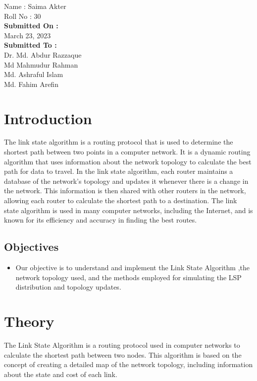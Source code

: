 \documentclass[11pt]{article}
\begin{document}
\begin{titlepage}
\begin{large}
			Name : Saima Akter\\[8pt]
			Roll No : 30\\[12pt]
		\textbf{Submitted On : \\[12pt]}
			March 23, 2023\\[20pt]
		\textbf{Submitted To :\\[12pt]}
			Dr. Md. Abdur Razzaque\\[12pt]
                Md Mahmudur Rahman\\[12pt]
                Md. Ashraful Islam\\[12pt]
                Md. Fahim Arefin
	\end{large}
\end{titlepage}

\section{Introduction}
The link state algorithm is a routing protocol that is used to determine the shortest path between two points in a computer network. It is a dynamic routing algorithm that uses information about the network topology to calculate the best path for data to travel. In the link state algorithm, each router maintains a database of the network's topology and updates it whenever there is a change in the network. This information is then shared with other routers in the network, allowing each router to calculate the shortest path to a destination. The link state algorithm is used in many computer networks, including the Internet, and is known for its efficiency and accuracy in finding the best routes.

\subsection{Objectives}
\begin{itemize}
    \item Our objective is to understand and implement the Link State Algorithm ,the network
topology used, and the methods employed for simulating the LSP distribution and topology updates.

\end{itemize}
\section{Theory}
The Link State Algorithm is a routing protocol used in computer networks to calculate the shortest path between two nodes. This algorithm is based on the concept of creating a detailed map of the network topology, including information about the state and cost of each link.
\end{document}
